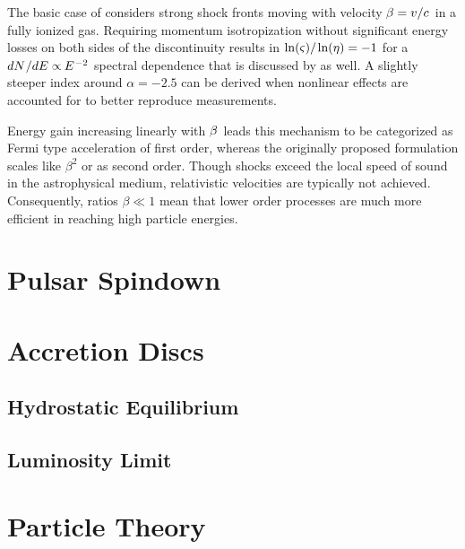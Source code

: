 The basic case of  considers strong shock fronts moving with velocity $\kern-0.5pt \beta = v / c \kern+1.0pt$ in a
fully ionized gas. Requiring momentum isotropization without significant energy losses on both sides of the discontinuity results
in $\ln(\varsigma) / \kern-0.5pt \ln(\eta) = -1$ for a $dN \kern+0.5pt / dE \propto \kern-0.5pt E^{\kern+0.5pt -2}$ spectral dependence
that is discussed by \cite{Longair_2011} as well. A slightly steeper index around $\alpha = \num{-2.5}$ can be derived when nonlinear
effects are accounted for to better reproduce measurements.

Energy gain increasing linearly with $\kern-0.5pt \beta \kern+1.0pt$ leads this mechanism to be categorized as Fermi type acceleration
of first order, whereas the originally proposed formulation scales like $\beta^2$ or as second order. Though shocks exceed the local
speed of sound in the astrophysical medium, relativistic velocities are typically not achieved. Consequently, ratios $\beta \ll 1$ mean
that lower order processes are much more efficient in reaching high particle energies.



\section{Pulsar Spindown}
\label{sec:spindown}



\section{Accretion Discs}
\label{sec:luminosity}

\cite{Longair_2011}

\subsection*{Hydrostatic Equilibrium}



\subsection*{Luminosity Limit}



\section{Particle Theory}
\label{sec:theory}




